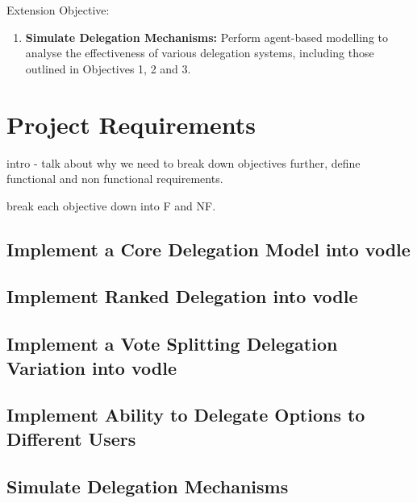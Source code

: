 Extension Objective:
\begin{enumerate}
    \item \textbf{Simulate Delegation Mechanisms: } Perform agent-based modelling to analyse the effectiveness of various delegation systems, including those outlined in Objectives 1, 2 and 3.
\end{enumerate}

\section{Project Requirements}
intro - talk about why we need to break down objectives further, define functional and non functional requirements.

break each objective down into F and NF.
\subsection{Implement a Core Delegation Model into vodle}
\subsection{Implement Ranked Delegation into vodle}
\subsection{Implement a Vote Splitting Delegation Variation into vodle}
\subsection{Implement Ability to Delegate Options to Different Users}
\subsection{Simulate Delegation Mechanisms}